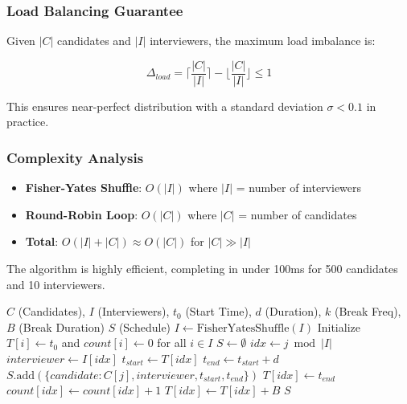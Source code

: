 \documentclass[conference]{IEEEtran}
\begin{document}
\subsubsection{Load Balancing Guarantee}

Given $|C|$ candidates and $|I|$ interviewers, the maximum load imbalance is:

\begin{equation}
\Delta_{load} = \lceil \frac{|C|}{|I|} \rceil - \lfloor \frac{|C|}{|I|} \rfloor \leq 1
\end{equation}

This ensures near-perfect distribution with a standard deviation $\sigma < 0.1$ in practice.

\subsubsection{Complexity Analysis}

\begin{itemize}
    \item \textbf{Fisher-Yates Shuffle}: $O(|I|)$ where $|I|$ = number of interviewers
    \item \textbf{Round-Robin Loop}: $O(|C|)$ where $|C|$ = number of candidates
    \item \textbf{Total}: $O(|I| + |C|) \approx O(|C|)$ for $|C| \gg |I|$
\end{itemize}

The algorithm is highly efficient, completing in under 100ms for 500 candidates and 10 interviewers.

\begin{algorithm}
\caption{Break-Aware Round-Robin Scheduling}
\label{alg:scheduling}
\begin{algorithmic}[1]
\REQUIRE $C$ (Candidates), $I$ (Interviewers), $t_0$ (Start Time), $d$ (Duration), $k$ (Break Freq), $B$ (Break Duration)
\ENSURE $S$ (Schedule)
\STATE $I \leftarrow \text{FisherYatesShuffle}(I)$
\STATE Initialize $T[i] \leftarrow t_0$ and $count[i] \leftarrow 0$ for all $i \in I$
\STATE $S \leftarrow \emptyset$
    \STATE $idx \leftarrow j \bmod |I|$
    \STATE $interviewer \leftarrow I[idx]$
    \STATE $t_{start} \leftarrow T[idx]$
    \STATE $t_{end} \leftarrow t_{start} + d$
    \STATE $S.\text{add}(\{candidate: C[j], interviewer, t_{start}, t_{end}\})$
    \STATE $T[idx] \leftarrow t_{end}$
    \STATE $count[idx] \leftarrow count[idx] + 1$
        \STATE $T[idx] \leftarrow T[idx] + B$
    \ENDIF
\ENDFOR
\RETURN $S$
\end{algorithmic}
\end{algorithm}
\end{document}
